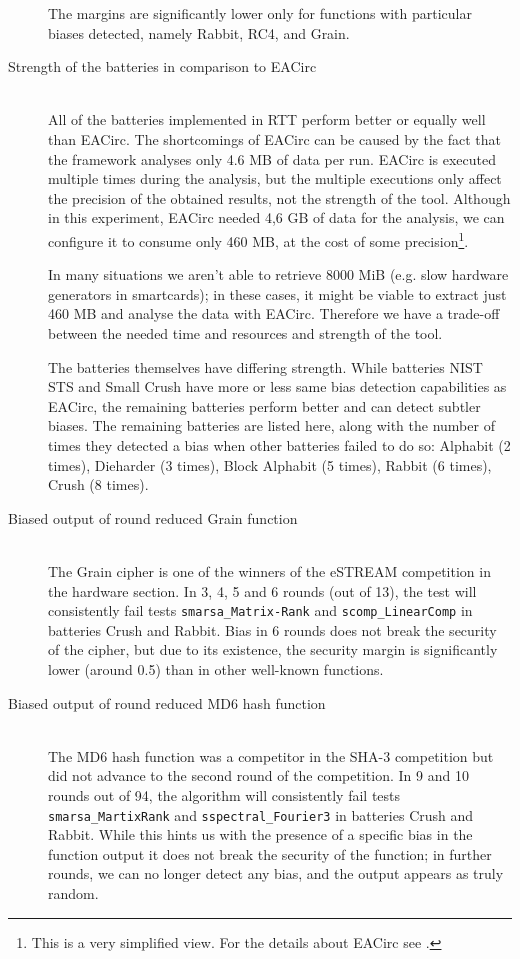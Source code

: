 \documentclass[
	digital,    %
	oneside,    %
	color,
	11pt,
	nocover,
	notable,
	nolof,
	nolot,
]{fithesis3}
\theoremstyle{definition}
\theoremstyle{remark}
\begin{document}
\begin{description}
The margins are significantly lower only for functions with particular biases detected, namely Rabbit, RC4, and Grain.

\item[Strength of the batteries in comparison to EACirc] \hfill \\
All of the batteries implemented in RTT perform better or equally well than EACirc. The shortcomings of EACirc can be caused by the fact that the framework analyses only 4.6 MB of data per run. EACirc is executed multiple times during the analysis, but the multiple executions only affect the precision of the obtained results, not the strength of the tool. Although in this experiment, EACirc needed 4,6 GB of data for the analysis, we can configure it to consume only 460 MB, at the cost of some precision\footnote{This is a very simplified view. For the details about EACirc see \cite{kubicek-dp}.}. 

In many situations we aren't able to retrieve 8000 MiB (e.g. slow hardware generators in smartcards); in these cases, it might be viable to extract just 460 MB and analyse the data with EACirc. Therefore we have a trade-off between the needed time and resources and strength of the tool.

The batteries themselves have differing strength. While batteries NIST STS and Small Crush have more or less same bias detection capabilities as EACirc, the remaining batteries perform better and can detect subtler biases. The remaining batteries are listed here, along with the number of times they detected a bias when other batteries failed to do so: Alphabit (2 times), Dieharder (3 times), Block Alphabit (5 times), Rabbit (6 times), Crush (8 times).

\item[Biased output of round reduced Grain function] \hfill \\
The Grain cipher \cite{grain} is one of the winners of the eSTREAM competition in the hardware section. In 3, 4, 5 and 6 rounds (out of 13), the test will consistently fail tests \texttt{smarsa\_Matrix-\linebreak Rank} and \texttt{scomp\_LinearComp} in batteries Crush and Rabbit.  Bias in 6 rounds does not break the security of the cipher, but due to its existence, the security margin is significantly lower (around 0.5) than in other well-known functions. 

\item[Biased output of round reduced MD6 hash function] \hfill \\
The MD6 hash function \cite{md6} was a competitor in the SHA-3 competition but did not advance to the second round of the competition. In 9 and 10 rounds out of 94, the algorithm will consistently fail tests \texttt{smarsa\_MartixRank} and \texttt{sspectral\_Fourier3} in batteries Crush and Rabbit. While this hints us with the presence of a specific bias in the function output it does not break the security of the function; in further rounds, we can no longer detect any bias, and the output appears as truly random.

\end{description}
\end{document}
